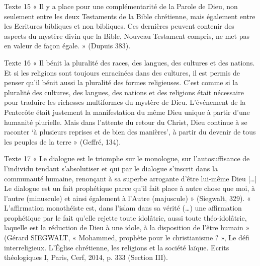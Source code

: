 Texte 15  « Il y a place pour une complémentarité de la Parole de Dieu, non seulement entre les deux Testaments de la Bible chrétienne, mais également entre les Ecritures bibliques et  non bibliques. Ces dernières peuvent contenir des aspects du mystère divin que la Bible, Nouveau Testament compris, ne met pas en valeur de façon égale. » (Dupuis 383).


Texte 16  « Il bénit la pluralité des races, des langues, des cultures et des nations. Et si les religions sont toujours enracinées dans des cultures, il est permis de penser qu’il bénit aussi la pluralité des formes religieuses. C’est comme si la pluralité des cultures, des langues, des nations et des religions était nécessaire pour traduire les richesses multiformes du mystère de Dieu. L’événement de la Pentecôte était justement la manifestation du même Dieu unique à partir d’une humanité plurielle. Mais dans l’attente du retour du Christ, Dieu continue à se raconter ‘à plusieurs reprises et de bien des manières’, à partir du devenir de tous les peuples de la terre » (Geffré, 134). 



Texte 17 « Le dialogue est le triomphe sur le monologue, sur l’autosuffisance de l’individu tendant s’absolutiser et qui par le dialogue s’inscrit dans la communauté humaine, renonçant à sa superbe arrogante d’être lui-même Dieu […] Le dialogue est un fait prophétique parce qu’il  fait place à autre chose que moi, à l’autre (minuscule) et ainsi également à l’Autre (majuscule) » (Siegwalt, 329). « L’affirmation monothéiste est, dans l’islam dans sa vérité (…) une affirmation prophétique par le fait qu’elle rejette toute idolâtrie, aussi toute théo-idolâtrie, laquelle est la réduction de Dieu à une idole, à la disposition de l’être humain » (Gérard SIEGWALT, « Mohammed, prophète pour le christianisme ? », Le défi interreligieux. L’Église chrétienne, les religions et la société laïque. Ecrits théologiques I, Paris, Cerf, 2014, p. 333 (Section III). 